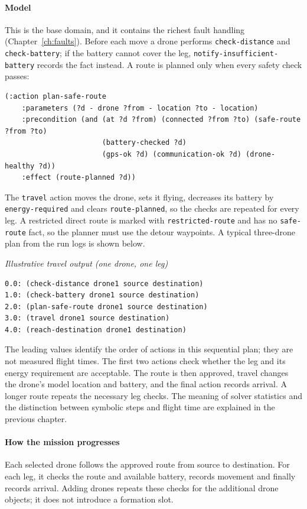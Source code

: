 \documentclass[11pt,a4paper,oneside]{report}
\newcommand{\code}[1]{\texttt{#1}}
\newcommand{\recordlabel}[1]{\par\smallskip\noindent\hspace*{1.2em}\textit{#1}\par}
\begin{document}
\paragraph{Model}
This is the base domain, and it contains the richest fault handling (Chapter~\ref{ch:faults}).
Before each move a drone performs \code{check-distance} and \code{check-battery}; if the battery
cannot cover the leg, {\small\code{notify-insufficient-battery}} records the fact instead. A route is
planned only when every safety check passes:

\begin{lstlisting}
(:action plan-safe-route
    :parameters (?d - drone ?from - location ?to - location)
    :precondition (and (at ?d ?from) (connected ?from ?to) (safe-route ?from ?to)
                       (battery-checked ?d)
                       (gps-ok ?d) (communication-ok ?d) (drone-healthy ?d))
    :effect (route-planned ?d))
\end{lstlisting}

\noindent The \code{travel} action moves the drone, sets it flying, decreases its battery by
\code{energy-required} and clears \code{route-planned}, so the checks are repeated for every leg.
A restricted direct route is marked with \code{restricted-route} and has no \code{safe-route}
fact, so the planner must use the detour waypoints. A typical three-drone plan from the run logs
is shown below.

\recordlabel{Illustrative travel output (one drone, one leg)}
\begin{lstlisting}[style=plain]
0.0: (check-distance drone1 source destination)
1.0: (check-battery drone1 source destination)
2.0: (plan-safe-route drone1 source destination)
3.0: (travel drone1 source destination)
4.0: (reach-destination drone1 destination)
\end{lstlisting}
\noindent The leading values identify the order of actions in this sequential
plan; they are not measured flight times. The first two actions check whether
the leg and its energy requirement are acceptable. The route is then approved,
travel changes the drone's model location and battery, and the final action
records arrival. A longer route repeats the necessary leg checks. The meaning of solver statistics and the distinction between symbolic steps
and flight time are explained in the previous chapter.

\paragraph{How the mission progresses}
Each selected drone follows the approved route from source to destination. For each leg, it checks the route and available battery, records movement and finally records arrival. Adding drones repeats these checks for the additional drone objects; it does not introduce a formation slot.
\end{document}
